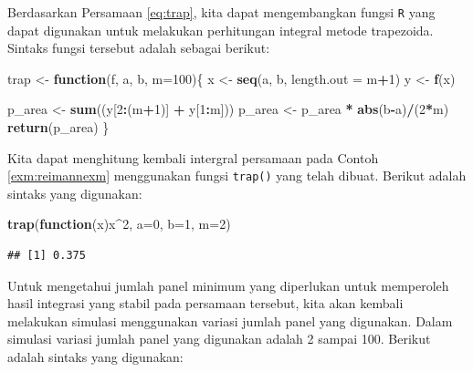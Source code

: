 \documentclass[
]{book}
\newenvironment{Shaded}{\begin{snugshade}}{\end{snugshade}}
\newcommand{\AttributeTok}[1]{\textcolor[rgb]{0.13,0.29,0.53}{#1}}
\newcommand{\ControlFlowTok}[1]{\textcolor[rgb]{0.13,0.29,0.53}{\textbf{#1}}}
\newcommand{\DecValTok}[1]{\textcolor[rgb]{0.00,0.00,0.81}{#1}}
\newcommand{\FunctionTok}[1]{\textcolor[rgb]{0.13,0.29,0.53}{\textbf{#1}}}
\newcommand{\NormalTok}[1]{#1}
\newcommand{\OtherTok}[1]{\textcolor[rgb]{0.56,0.35,0.01}{#1}}
\newcommand{\SpecialCharTok}[1]{\textcolor[rgb]{0.81,0.36,0.00}{\textbf{#1}}}
\theoremstyle{definition}
\theoremstyle{definition}
\theoremstyle{definition}
\theoremstyle{definition}
\theoremstyle{remark}
\begin{document}
Berdasarkan Persamaan \eqref{eq:trap}, kita dapat mengembangkan fungsi \texttt{R} yang dapat digunakan untuk melakukan perhitungan integral metode trapezoida. Sintaks fungsi tersebut adalah sebagai berikut:

\begin{Shaded}
\begin{Highlighting}[]
\NormalTok{trap }\OtherTok{\textless{}{-}} \ControlFlowTok{function}\NormalTok{(f, a, b, }\AttributeTok{m=}\DecValTok{100}\NormalTok{)\{}
\NormalTok{  x }\OtherTok{\textless{}{-}} \FunctionTok{seq}\NormalTok{(a, b, }\AttributeTok{length.out =}\NormalTok{ m}\SpecialCharTok{+}\DecValTok{1}\NormalTok{)}
\NormalTok{  y }\OtherTok{\textless{}{-}} \FunctionTok{f}\NormalTok{(x)}
  
\NormalTok{  p\_area }\OtherTok{\textless{}{-}} \FunctionTok{sum}\NormalTok{((y[}\DecValTok{2}\SpecialCharTok{:}\NormalTok{(m}\SpecialCharTok{+}\DecValTok{1}\NormalTok{)] }\SpecialCharTok{+}\NormalTok{ y[}\DecValTok{1}\SpecialCharTok{:}\NormalTok{m])) }
\NormalTok{  p\_area }\OtherTok{\textless{}{-}}\NormalTok{ p\_area }\SpecialCharTok{*} \FunctionTok{abs}\NormalTok{(b}\SpecialCharTok{{-}}\NormalTok{a)}\SpecialCharTok{/}\NormalTok{(}\DecValTok{2}\SpecialCharTok{*}\NormalTok{m)}
  \FunctionTok{return}\NormalTok{(p\_area)}
\NormalTok{\}}
\end{Highlighting}
\end{Shaded}

Kita dapat menghitung kembali intergral persamaan pada Contoh \ref{exm:reimannexm} menggunakan fungsi \texttt{trap()} yang telah dibuat. Berikut adalah sintaks yang digunakan:

\begin{Shaded}
\begin{Highlighting}[]
\FunctionTok{trap}\NormalTok{(}\ControlFlowTok{function}\NormalTok{(x)x}\SpecialCharTok{\^{}}\DecValTok{2}\NormalTok{, }\AttributeTok{a=}\DecValTok{0}\NormalTok{, }\AttributeTok{b=}\DecValTok{1}\NormalTok{, }\AttributeTok{m=}\DecValTok{2}\NormalTok{)}
\end{Highlighting}
\end{Shaded}

\begin{verbatim}
## [1] 0.375
\end{verbatim}

Untuk mengetahui jumlah panel minimum yang diperlukan untuk memperoleh hasil integrasi yang stabil pada persamaan tersebut, kita akan kembali melakukan simulasi menggunakan variasi jumlah panel yang digunakan. Dalam simulasi variasi jumlah panel yang digunakan adalah 2 sampai 100. Berikut adalah sintaks yang digunakan:
\end{document}
